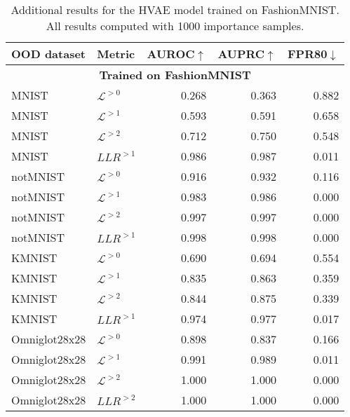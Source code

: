 {\begin{table}[t]
    \caption[Additional results for the HVAE model trained on FashionMNIST.]{Additional results for the HVAE model trained on FashionMNIST. All results computed with 1000 importance samples.}
    \label{tab_hierarchical:additional-results-fashionmnist}
    \centering
    \begin{tabular}{llrrr}
        \toprule
         OOD dataset & Metric & AUROC$\uparrow$ & AUPRC$\uparrow$ & FPR80$\downarrow$ \\
         \midrule
         \multicolumn{5}{c}{\textbf{Trained on FashionMNIST}} \\
         \midrule
MNIST                    & $\mathcal{L}^{>0}$     &  0.268  &  0.363  &  0.882 \\
MNIST                    & $\mathcal{L}^{>1}$     &  0.593  &  0.591  &  0.658 \\
MNIST                    & $\mathcal{L}^{>2}$     &  0.712  &  0.750  &  0.548 \\
MNIST                    & $LLR^{>1}$             &  0.986  &  0.987  &  0.011 \\
\midrule
notMNIST                 &  $\mathcal{L}^{>0}$    &  0.916  &  0.932  &  0.116 \\
notMNIST                 &  $\mathcal{L}^{>1}$    &  0.983  &  0.986  &  0.000 \\
notMNIST                 &  $\mathcal{L}^{>2}$    &  0.997  &  0.997  &  0.000 \\
notMNIST                 &  $LLR^{>1}$            &  0.998  &  0.998  &  0.000 \\
\midrule
KMNIST                   &  $\mathcal{L}^{>0}$    &  0.690  &  0.694  &  0.554 \\
KMNIST                   &  $\mathcal{L}^{>1}$    &  0.835  &  0.863  &  0.359 \\
KMNIST                   &  $\mathcal{L}^{>2}$    &  0.844  &  0.875  &  0.339 \\
KMNIST                   &  $LLR^{>1}$            &  0.974  &  0.977  &  0.017 \\
\midrule
Omniglot28x28            &  $\mathcal{L}^{>0}$    &  0.898  &  0.837  &  0.166 \\
Omniglot28x28            &  $\mathcal{L}^{>1}$    &  0.991  &  0.989  &  0.011 \\
Omniglot28x28            &  $\mathcal{L}^{>2}$    &  1.000  &  1.000  &  0.000 \\
Omniglot28x28            &  $LLR^{>2}$            &  1.000  &  1.000  &  0.000 \\

\end{tabular}
\end{table}}
